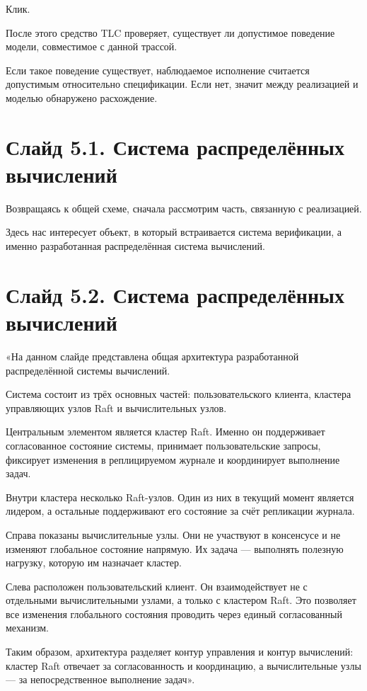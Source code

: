 \documentclass[12pt,a4paper]{article}
\begin{document}
Клик.

После этого средство TLC проверяет, существует ли допустимое поведение
модели, совместимое с данной трассой.

Если такое поведение существует, наблюдаемое исполнение считается
допустимым относительно спецификации. Если нет, значит между
реализацией и моделью обнаружено расхождение.

\section*{Слайд 5.1. Система распределённых вычислений}

Возвращаясь к общей схеме, сначала рассмотрим часть, связанную с
реализацией.

Здесь нас интересует объект, в который встраивается система
верификации, а именно разработанная распределённая система
вычислений.

\section*{Слайд 5.2. Система распределённых вычислений}

«На данном слайде представлена общая архитектура разработанной
распределённой системы вычислений.

Система состоит из трёх основных частей:
пользовательского клиента, кластера управляющих узлов Raft и
вычислительных узлов.

Центральным элементом является кластер Raft. Именно он поддерживает
согласованное состояние системы, принимает пользовательские запросы,
фиксирует изменения в реплицируемом журнале и координирует выполнение
задач.

Внутри кластера несколько Raft-узлов. Один из них в текущий момент
является лидером, а остальные поддерживают его состояние за счёт
репликации журнала.

Справа показаны вычислительные узлы. Они не участвуют в консенсусе и не
изменяют глобальное состояние напрямую. Их задача — выполнять полезную
нагрузку, которую им назначает кластер.

Слева расположен пользовательский клиент. Он взаимодействует не с
отдельными вычислительными узлами, а только с кластером Raft. Это
позволяет все изменения глобального состояния проводить через единый
согласованный механизм.

Таким образом, архитектура разделяет контур управления и контур
вычислений: кластер Raft отвечает за согласованность и координацию, а
вычислительные узлы — за непосредственное выполнение задач».
\end{document}
